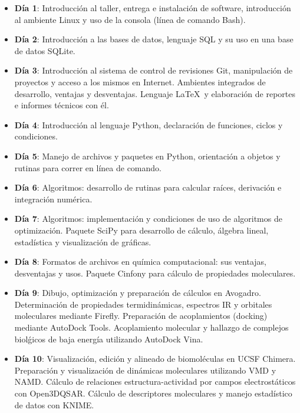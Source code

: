 \documentclass[10pt,letterpaper]{article}
\begin{document}
\begin{itemize}
\item \textbf{D\'ia 1}: Introducci\'on al taller, entrega e instalaci\'on de software, introducci\'on al ambiente Linux y uso de la consola (l\'inea de comando Bash).
\item \textbf{D\'ia 2}: Introducci\'on a las bases de datos, lenguaje SQL y su uso en una base de datos SQLite.
\item \textbf{D\'ia 3}: Introducci\'on al sistema de control de revisiones Git, manipulaci\'on de proyectos y acceso a los mismos en Internet. Ambientes integrados de desarrollo, ventajas y desventajas. Lenguaje \LaTeX\ y elaboraci\'on de reportes e informes t\'ecnicos con \'el.
\item \textbf{D\'ia 4}: Introducci\'on al lenguaje Python, declaraci\'on de funciones, ciclos y condiciones.
\item \textbf{D\'ia 5}: Manejo de archivos y paquetes en Python, orientaci\'on a objetos y rutinas para correr en l\'inea de comando.
\item \textbf{D\'ia 6}: Algoritmos: desarrollo de rutinas para calcular ra\'ices, derivaci\'on e integraci\'on num\'erica.
\item \textbf{D\'ia 7}: Algoritmos: implementaci\'on y condiciones de uso de algoritmos de optimizaci\'on. Paquete SciPy para desarrollo de c\'alculo, \'algebra lineal, estad\'istica y visualizaci\'on de gr\'aficas.
\item \textbf{D\'ia 8}: Formatos de archivos en qu\'imica computacional: sus ventajas, desventajas y usos. Paquete Cinfony para c\'alculo de propiedades moleculares.
\item \textbf{D\'ia 9}: Dibujo, optimizaci\'on y preparaci\'on de c\'alculos en Avogadro. Determinaci\'on de propiedades termidin\'amicas, espectros IR y orbitales moleculares mediante Firefly. Preparaci\'on de acoplamientos (docking) mediante AutoDock Tools. Acoplamiento molecular y hallazgo de complejos biol\'gicos de baja energ\'ia utilizando AutoDock Vina.
\item \textbf{D\'ia 10}: Visualizaci\'on, edici\'on y alineado de biomol\'eculas en UCSF Chimera. Preparaci\'on y visualizaci\'on de din\'amicas moleculares utilizando VMD y NAMD. C\'alculo de relaciones estructura-actividad por campos electrost\'aticos con Open3DQSAR. C\'alculo de descriptores moleculares y manejo estad\'istico de datos con KNIME.
\end{itemize}
\end{document}
